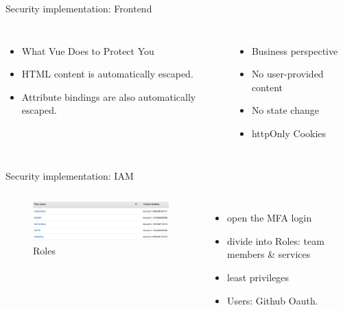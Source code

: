 \documentclass[aspectratio=169]{beamer}
\begin{document}
\begin{frame}[fragile]{Security implementation: Frontend}

  \begin{columns}
	  \begin{itemize}
        \item What Vue Does to Protect You
        \pause
        \item HTML content is automatically escaped.
        \item Attribute bindings are also automatically escaped.
      \end{itemize}

      \begin{itemize}
        \item Business perspective
		\pause
        \item No user-provided content
        \pause
        \item No state change
		\pause
		\item httpOnly Cookies
      \end{itemize}
  \end{columns}

\end{frame}

\begin{frame}[fragile]{Security implementation: IAM}

  \begin{columns}
      \begin{figure}[htbp]
        \centerline{\includegraphics[width=220pt]{images/roles.png}}
        \caption{Roles}
        \label{roles}
      \end{figure}
      \begin{itemize}
        \item open the MFA login
        \item divide into Roles: team members \& services
        \item least privileges
        \pause
        \item Users: Github Oauth.
      \end{itemize}
  \end{columns}

\end{frame}
\end{document}

